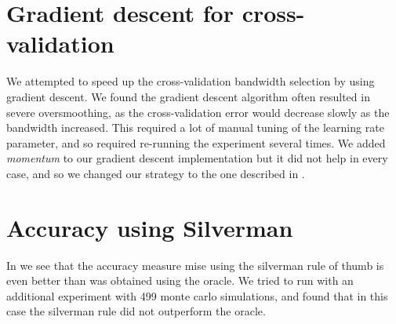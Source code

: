 \section{Gradient descent for cross-validation}
\label{sec:discussion:gradient_descent}

We attempted to speed up the cross-validation bandwidth selection by using gradient descent.
We found the gradient descent algorithm often resulted in severe oversmoothing,
as the cross-validation error would decrease slowly as the bandwidth increased.
This required a lot of manual tuning of the learning rate parameter, and so required re-running the experiment several times.
We added \textit{momentum} to our gradient descent implementation but it did not help in every case, and so we changed our strategy to the one described in .

\section{Accuracy using Silverman}

In  we see that the accuracy measure \gls{mise} using the \gls{silverman} rule of thumb is even better than was obtained using the \gls{oracle}.
We tried to run with an additional experiment with 499 monte carlo simulations, and found that in this case the \gls{silverman} rule did not outperform the \gls{oracle}.

